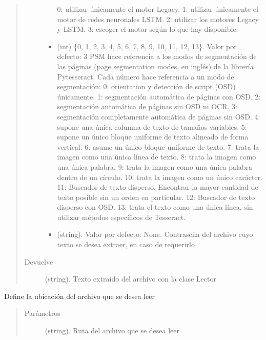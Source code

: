 \documentclass[letterpaper,10pt,openany,spanish]{sphinxmanual}
\begin{document}
\begin{fulllineitems}
\begin{fulllineitems}
\begin{quote}
\begin{description}
\begin{itemize}
 0: utilizar únicamente el motor Legacy.  
 1: utilizar únicamente el motor de redes neuronales LSTM.  
 2: utilizar los motores Legacy y LSTM.  
 3: escoger el motor según lo que hay disponible.  


\item {} 
 \textendash{} (int) \{0, 1, 2, 3, 4, 5, 6, 7, 8, 9, 10, 11, 12, 13\}. Valor por defecto: 3 PSM hace referencia a             los modos de segmentación de las páginas (page segmentation modes, en inglés) de la             librería Pytesseract. Cada número hace referencia a un modo de segmentación:               
 0: orientation y detección de script (OSD) únicamente.  
 1: segmentación automática de páginas con OSD.  
 2: segmentación automática de páginas sin OSD ni OCR.  
 3: segmentación completamente automática de páginas sin OSD.  
 4: supone una única columna de texto de tamaños variables.  
 5: supone un único bloque uniforme de texto alineado de forma vertical.  
 6: asume un único bloque uniforme de texto.  
 7: trata la imagen como una única línea de texto.  
 8: trata la imagen como una única palabra.  
 9: trata la imagen como una única palabra dentro de un círculo.  
 10: trata la imagen como un único carácter.  
 11: Buscador de texto disperso. Encontrar la mayor cantidad de texto posible sin un orden en particular.  
 12: Buscador de texto disperso con OSD.  
 13: trata el texto como una única línea, sin utilizar métodos específicos de Tesseract.  


\item {} 
 \textendash{} (string). Valor por defecto: None. Contraseña del archivo cuyo texto se desea             extraer, en caso de requerirlo

\end{itemize}

\item[{Devuelve}] \leavevmode
(string). Texto extraído del archivo con la clase Lector

\end{description}\end{quote}

\end{fulllineitems}


\begin{fulllineitems}
\label{\detokenize{funciones/lectura:lectura.Lector.establecer_ubicacion}}
Define la ubicación del archivo que se desea leer
\begin{quote}\begin{description}
\item[{Parámetros}] \leavevmode
{} \textendash{} (string). Ruta del archivo que se desea leer


\end{description}
\end{quote}
\end{fulllineitems}
\end{fulllineitems}
\end{document}
